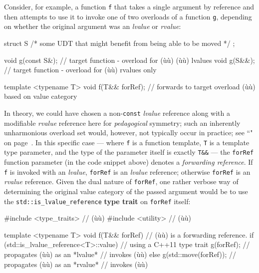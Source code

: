 Consider, for example, a function \texttt{f} that takes a single
argument by reference and then attempts to use it to invoke one of two
overloads of a function \texttt{g}, depending on whether the original
argument was an \emph{lvalue} or \emph{rvalue}:

\begin{emcppslisting}[emcppsbatch=e1]
struct S { /* some UDT that might benefit from being able to be moved */ };

void g(const S&);  // target function - overload for (ù{}ù) (ù{}ù) lvalues
void g(S&&);       // target function - overload for (ù{}ù) rvalues only

template <typename T>
void f(T&& forRef); // forwards to target overload (ù{}ù) based on value category
\end{emcppslisting}

\noindent In
theory, we could have chosen a non-\texttt{const} \emph{lvalue}
reference along with a modifiable \emph{rvalue} reference here for
\emph{pedagogical} symmetry; such an inherently unharmonious overload
set would, however, not typically occur in practice; see ``" on page~\pageref{Rvalue-References}. In this specific case --- where \texttt{f} is a function template,
\texttt{T} is a template type parameter, and the type of the parameter
itself is exactly \texttt{T\&\&} --- the \texttt{forRef} function
parameter (in the code snippet above) denotes a \emph{forwarding reference}. If \texttt{f}\label{f-invoked-example}
is invoked with an \emph{lvalue}, \texttt{forRef} is an \emph{lvalue}
reference; otherwise \texttt{forRef} is an \emph{rvalue} reference.
Given the dual nature of \texttt{forRef}, one rather verbose way of
determining the original value category of the passed argument would be
to use the \texttt{std::is\_lvalue\_reference} \textbf{type trait} on
\texttt{forRef} itself:

\begin{emcppslisting}[emcppsbatch=e1]
#include <type_traits>  // (ù{}ù)
#include <utility>  // (ù{}ù)

template <typename T>
void f(T&& forRef)      // (ù{}ù) is a forwarding reference.
{
    if (std::is_lvalue_reference<T>::value)  // using a C++11 type trait
    {
        g(forRef);             // propagates (ù{}ù) as an *lvalue*
    }                          // invokes (ù{}ù)
    else
    {
        g(std::move(forRef));  // propagates (ù{}ù) as an *rvalue*
    }                          // invokes (ù{}ù)
}
\end{emcppslisting}

